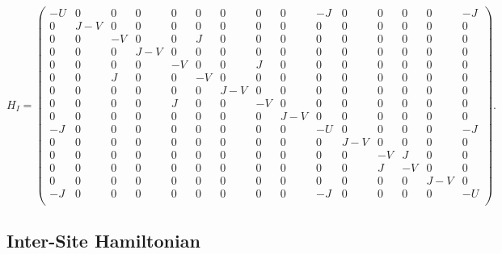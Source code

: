 \documentclass[10pt,nofootinbib]{revtex4}
\begin{document}
			\begin{equation}\label{2.1.7}
				H_I=\left(\begin{array}{ccccccccccccccc}
					 -U & 0 & 0 & 0 & 0 & 0 & 0 & 0 & 0 & -J & 0 & 0 & 0 & 0 & -J \\
					 0 & J-V & 0 & 0 & 0 & 0 & 0 & 0 & 0 & 0 & 0 & 0 & 0 & 0 & 0 \\
					 0 & 0 & -V & 0 & 0 & J & 0 & 0 & 0 & 0 & 0 & 0 & 0 & 0 & 0 \\
					 0 & 0 & 0 & J-V & 0 & 0 & 0 & 0 & 0 & 0 & 0 & 0 & 0 & 0 & 0 \\
					 0 & 0 & 0 & 0 & -V & 0 & 0 & J & 0 & 0 & 0 & 0 & 0 & 0 & 0 \\
					 0 & 0 & J & 0 & 0 & -V & 0 & 0 & 0 & 0 & 0 & 0 & 0 & 0 & 0 \\
					 0 & 0 & 0 & 0 & 0 & 0 & J-V & 0 & 0 & 0 & 0 & 0 & 0 & 0 & 0 \\
					 0 & 0 & 0 & 0 & J & 0 & 0 & -V & 0 & 0 & 0 & 0 & 0 & 0 & 0 \\
					 0 & 0 & 0 & 0 & 0 & 0 & 0 & 0 & J-V & 0 & 0 & 0 & 0 & 0 & 0 \\
					 -J & 0 & 0 & 0 & 0 & 0 & 0 & 0 & 0 & -U & 0 & 0 & 0 & 0 & -J \\
					 0 & 0 & 0 & 0 & 0 & 0 & 0 & 0 & 0 & 0 & J-V & 0 & 0 & 0 & 0 \\
					 0 & 0 & 0 & 0 & 0 & 0 & 0 & 0 & 0 & 0 & 0 & -V & J & 0 & 0 \\
					 0 & 0 & 0 & 0 & 0 & 0 & 0 & 0 & 0 & 0 & 0 & J & -V & 0 & 0 \\
					 0 & 0 & 0 & 0 & 0 & 0 & 0 & 0 & 0 & 0 & 0 & 0 & 0 & J-V & 0 \\
					 -J & 0 & 0 & 0 & 0 & 0 & 0 & 0 & 0 & -J & 0 & 0 & 0 & 0 & -U \\
				\end{array}\right).
			\end{equation}


	\subsection{Inter-Site Hamiltonian}
\end{document}
